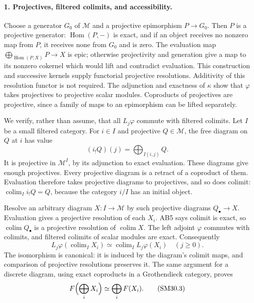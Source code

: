 \paragraph{1. Projectives, filtered colimits, and accessibility.}
Choose a generator \(G_0\) of \(\mathcal M\) and a projective
epimorphism \(P\to G_0\).  Then \(P\) is a projective generator:
\(\operatorname{Hom}(P,-)\) is exact, and if an object receives
no nonzero map from \(P\), it receives none from \(G_0\) and
is zero.  The evaluation map
\(\bigoplus_{\operatorname{Hom}(P,X)}P\to X\) is epic;
otherwise projectivity and generation give a map to its nonzero
cokernel which would lift and contradict evaluation.
This construction and successive kernels supply functorial
projective resolutions.  Additivity of this resolution functor
is not required.  The adjunction and exactness of \(\kappa\)
show that \(\varphi\) takes projectives to projective scalar
modules.  Coproducts of projectives are projective, since a
family of maps to an epimorphism can be lifted separately.

We verify, rather than assume, that all \(L_j\varphi\) commute
with filtered colimits.  Let \(I\) be a small filtered category.
For \(i\in I\) and projective \(Q\in\mathcal M\), the free
diagram on \(Q\) at \(i\) has value
\[
 (i_!Q)(j)=\bigoplus_{I(i,j)}Q.
\]
It is projective in \(\mathcal M^I\), by its adjunction to
exact evaluation.  These diagrams give enough projectives.
Every projective diagram is a retract of a coproduct of them.
Evaluation therefore takes projective diagrams to projectives,
and so does colimit: \(\operatorname{colim}_I i_!Q=Q\),
because the category \(i/I\) has an initial object.

Resolve an arbitrary diagram \(X:I\to\mathcal M\) by such
projective diagrams \(Q_\bullet\to X\).
Evaluation gives a projective resolution of each \(X_i\).
AB5 says colimit is exact, so \(\operatorname{colim}Q_\bullet\)
is a projective resolution of \(\operatorname{colim}X\).
The left adjoint \(\varphi\) commutes with colimits, and
filtered colimits of scalar modules are exact.  Consequently
\[
 L_j\varphi(\operatorname{colim}_I X_i)
   \simeq\operatorname{colim}_I L_j\varphi(X_i)
       \quad(j\ge0).                                    \tag{SM30.2}
\]
The isomorphism is canonical: it is induced by the diagram's
colimit maps, and comparison of projective resolutions preserves
it.  The same argument for a discrete diagram, using exact
coproducts in a Grothendieck category, proves
\[
 F\Bigl(\bigoplus_i X_i\Bigr)\simeq\bigoplus_i F(X_i).
                                                               \tag{SM30.3}
\]

